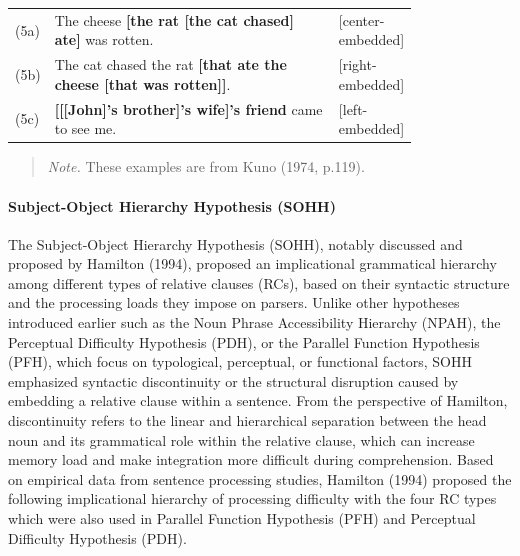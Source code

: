 \documentclass[
]{article}
\begin{document}
\vspace{1em}

\setlength{\parindent}{0pt}
\noindent
\begin{tabular}[t]{@{}p{0.05\linewidth} p{0.75\linewidth} >{\raggedleft\arraybackslash}p{2.5cm}@{}}
(5a) & The cheese \textbf{[the rat [the cat chased] ate]} was rotten. & {\small [center-embedded]} \\
(5b) & The cat chased the rat \textbf{[that ate the cheese [that was rotten]]}. & {\small [right-embedded]} \\
(5c) & \textbf{[[[John]'s brother]'s wife]'s friend} came to see me. & {\small [left-embedded]} \\
\end{tabular}

\vspace{0.5em}

\noindent
\begin{quote}
\small
\textit{Note.} These examples are from Kuno (1974, p.119).
\end{quote}

\vspace{1em}

\clearpage

\paragraph{Subject-Object Hierarchy Hypothesis
(SOHH)}\label{subject-object-hierarchy-hypothesis-sohh}

\setlength{\parindent}{1.27cm}

The Subject-Object Hierarchy Hypothesis (SOHH), notably discussed and
proposed by Hamilton (1994), proposed an implicational grammatical
hierarchy among different types of relative clauses (RCs), based on
their syntactic structure and the processing loads they impose on
parsers. Unlike other hypotheses introduced earlier such as the Noun
Phrase Accessibility Hierarchy (NPAH), the Perceptual Difficulty
Hypothesis (PDH), or the Parallel Function Hypothesis (PFH), which focus
on typological, perceptual, or functional factors, SOHH emphasized
syntactic discontinuity or the structural disruption caused by embedding
a relative clause within a sentence. From the perspective of Hamilton,
discontinuity refers to the linear and hierarchical separation between
the head noun and its grammatical role within the relative clause, which
can increase memory load and make integration more difficult during
comprehension. Based on empirical data from sentence processing studies,
Hamilton (1994) proposed the following implicational hierarchy of
processing difficulty with the four RC types which were also used in
Parallel Function Hypothesis (PFH) and Perceptual Difficulty Hypothesis
(PDH).
\end{document}
